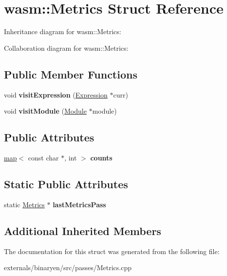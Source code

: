 \hypertarget{structwasm_1_1_metrics}{}\section{wasm\+:\+:Metrics Struct Reference}
\label{structwasm_1_1_metrics}


Inheritance diagram for wasm\+:\+:Metrics\+:


Collaboration diagram for wasm\+:\+:Metrics\+:
\subsection*{Public Member Functions}
\begin{DoxyCompactItemize}
\item 
\mbox{\label{structwasm_1_1_metrics_a8ef17714b7ad51933791d2c55358f729}} 
void {\bfseries visit\+Expression} (\mbox{\hyperlink{classwasm_1_1_expression}{Expression}} $\ast$curr)
\item 
\mbox{\label{structwasm_1_1_metrics_a27f1160988632c31957b4698bad85a54}} 
void {\bfseries visit\+Module} (\mbox{\hyperlink{classwasm_1_1_module}{Module}} $\ast$module)
\end{DoxyCompactItemize}
\subsection*{Public Attributes}
\begin{DoxyCompactItemize}
\item 
\mbox{\label{structwasm_1_1_metrics_af83bfd5d9fbd013bdffaeb6e5e081910}} 
\mbox{\hyperlink{classstd_1_1map}{map}}$<$ const char $\ast$, int $>$ {\bfseries counts}
\end{DoxyCompactItemize}
\subsection*{Static Public Attributes}
\begin{DoxyCompactItemize}
\item 
\mbox{\label{structwasm_1_1_metrics_af6a7d4373ddc9e8e81bae4146cc56926}} 
static \mbox{\hyperlink{structwasm_1_1_metrics}{Metrics}} $\ast$ {\bfseries last\+Metrics\+Pass}
\end{DoxyCompactItemize}
\subsection*{Additional Inherited Members}


The documentation for this struct was generated from the following file\+:\begin{DoxyCompactItemize}
\item 
externals/binaryen/src/passes/Metrics.\+cpp\end{DoxyCompactItemize}
